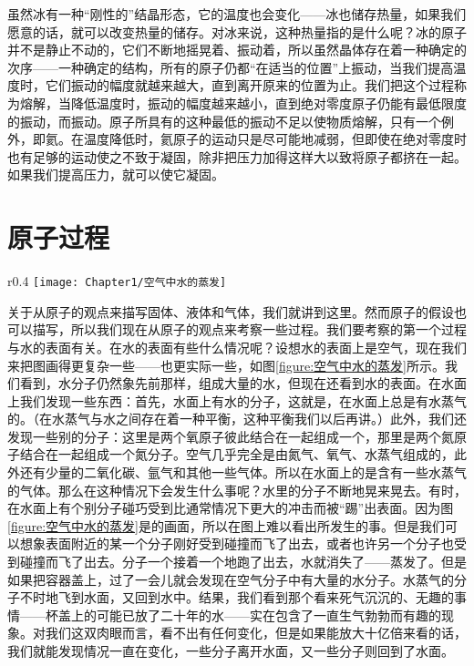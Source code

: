虽然冰有一种“刚性的”结晶形态，它的温度也会变化——冰也储存热量，如果我们愿意的话，就可以改变热量的储存。对冰来说，这种热量指的是什么呢？冰的原子并不是静止不动的，它们不断地摇晃着、振动着，所以虽然晶体存在着一种确定的次序——一种确定的结构，所有的原子仍都“在适当的位置”上振动，当我们提高温度时，它们振动的幅度就越来越大，直到离开原来的位置为止。我们把这个过程称为熔解，当降低温度时，振动的幅度越来越小，直到绝对零度原子仍能有最低限度的振动，而振动。原子所具有的这种最低的振动不足以使物质熔解，只有一个例外，即氦。在温度降低时，氦原子的运动只是尽可能地减弱，但即使在绝对零度时也有足够的运动使之不致于凝固，除非把压力加得这样大以致将原子都挤在一起。如果我们提高压力，就可以使它凝固。

\section{原子过程}

\begin{wrapfigure}{r}{0.4\textwidth}
    \centering
    \texttt{[image: Chapter1/空气中水的蒸发]}
    \caption{空气中水的蒸发}
    \label{figure:空气中水的蒸发}
\end{wrapfigure}
关于从原子的观点来描写固体、液体和气体，我们就讲到这里。然而原子的假设也可以描写，所以我们现在从原子的观点来考察一些过程。我们要考察的第一个过程与水的表面有关。在水的表面有些什么情况呢？设想水的表面上是空气，现在我们来把图画得更复杂一些——也更实际一些，如图\ref{figure:空气中水的蒸发}所示。我们看到，水分子仍然象先前那样，组成大量的水，但现在还看到水的表面。在水面上我们发现一些东西：首先，水面上有水的分子，这就是，在水面上总是有水蒸气的。（在水蒸气与水之间存在着一种平衡，这种平衡我们以后再讲。）此外，我们还发现一些别的分子：这里是两个氧原子彼此结合在一起组成一个，那里是两个氮原子结合在一起组成一个氮分子。空气几乎完全是由氮气、氧气、水蒸气组成的，此外还有少量的二氧化碳、氩气和其他一些气体。所以在水面上的是含有一些水蒸气的气体。那么在这种情况下会发生什么事呢？水里的分子不断地晃来晃去。有时，在水面上有个别分子碰巧受到比通常情况下更大的冲击而被“踢”出表面。因为图\ref{figure:空气中水的蒸发}是的画面，所以在图上难以看出所发生的事。但是我们可以想象表面附近的某一个分子刚好受到碰撞而飞了出去，或者也许另一个分子也受到碰撞而飞了出去。分子一个接着一个地跑了出去，水就消失了——蒸发了。但是如果把容器盖上，过了一会儿就会发现在空气分子中有大量的水分子。水蒸气的分子不时地飞到水面，又回到水中。结果，我们看到那个看来死气沉沉的、无趣的事情——杯盖上的可能已放了二十年的水——实在包含了一直生气勃勃而有趣的现象。对我们这双肉眼而言，看不出有任何变化，但是如果能放大十亿倍来看的话，我们就能发现情况一直在变化，一些分子离开水面，又一些分子则回到了水面。


